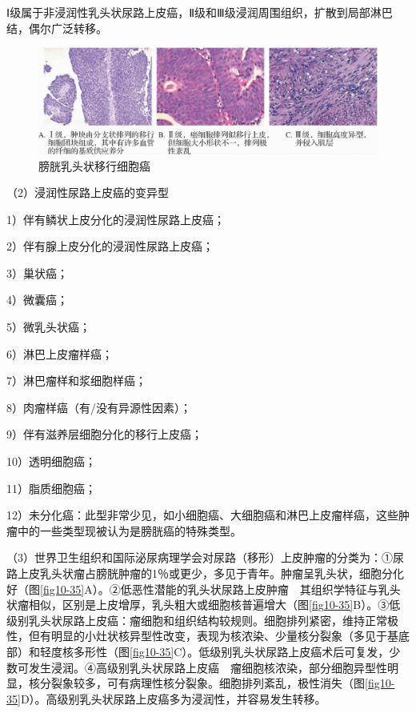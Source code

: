 Ⅰ级属于非浸润性乳头状尿路上皮癌，Ⅱ级和Ⅲ级浸润周围组织，扩散到局部淋巴结，偶尔广泛转移。

\begin{figure}[!htbp]
 \centering
 \includegraphics{./images/Image00183.jpg}
 \captionsetup{justification=centering}
 \caption{膀胱乳头状移行细胞癌}
 \label{fig10-34}
  \end{figure} 

（2）浸润性尿路上皮癌的变异型

1）伴有鳞状上皮分化的浸润性尿路上皮癌；

2）伴有腺上皮分化的浸润性尿路上皮癌；

3）巢状癌；

4）微囊癌；

5）微乳头状癌；

6）淋巴上皮瘤样癌；

7）淋巴瘤样和浆细胞样癌；

8）肉瘤样癌（有/没有异源性因素）；

9）伴有滋养层细胞分化的移行上皮癌；

10）透明细胞癌；

11）脂质细胞癌；

12）未分化癌：此型非常少见，如小细胞癌、大细胞癌和淋巴上皮瘤样癌，这些肿瘤中的一些类型现被认为是膀胱癌的特殊类型。

（3）世界卫生组织和国际泌尿病理学会对尿路（移形）上皮肿瘤的分类为：①尿路上皮乳头状瘤占膀胱肿瘤的1％或更少，多见于青年。肿瘤呈乳头状，细胞分化好（图\ref{fig10-35}A）。②低恶性潜能的乳头状尿路上皮肿瘤　其组织学特征与乳头状瘤相似，区别是上皮增厚，乳头粗大或细胞核普遍增大（图\ref{fig10-35}B）。③低级别乳头状尿路上皮癌：瘤细胞和组织结构较规则。细胞排列紧密，维持正常极性，但有明显的小灶状核异型性改变，表现为核浓染、少量核分裂象（多见于基底部）和轻度核多形性（图\ref{fig10-35}C）。低级别乳头状尿路上皮癌术后可复发，少数可发生浸润。④高级别乳头状尿路上皮癌　瘤细胞核浓染，部分细胞异型性明显，核分裂象较多，可有病理性核分裂象。细胞排列紊乱，极性消失（图\ref{fig10-35}D）。高级别乳头状尿路上皮癌多为浸润性，并容易发生转移。

